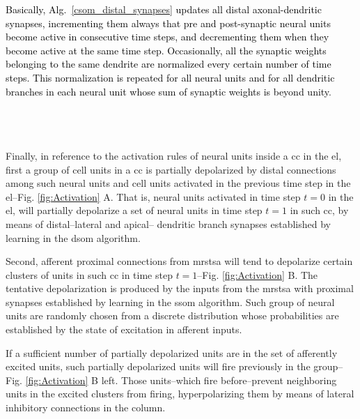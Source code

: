 \documentclass[10pt,letterpaper]{article}
\newcommand{\reviewerfour}[1]{\textcolor{black}{#1}}
\begin{document}
\reviewerfour{Basically, Alg.~\ref{csom_distal_synapses} updates all distal axonal-dendritic synapses, incrementing  them always that pre and post-synaptic neural units become active in consecutive time steps, and decrementing them when they become active at the same time step. Occasionally, all the synaptic weights belonging to the same dendrite are normalized every certain number of time steps. This normalization is repeated for all neural units and for all dendritic branches in each neural unit whose sum of synaptic weights is beyond unity}.







~\\
~\\
~\\

Finally, in reference to the activation rules of neural units inside a \gls{cc} in the \gls{el},
first a group of cell units in a \gls{cc} is partially depolarized 
by distal connections among such neural units and cell units activated in the
previous time step in the \gls{el}--Fig. \ref{fig:Activation} A.
That is, neural units activated in time step $t=0$ in the \gls{el}, will partially depolarize
a set of neural units in time step $t=1$ in such \gls{cc}, by means of distal--lateral and apical--
dendritic branch synapses established by learning in the \gls{dsom} algorithm.

Second, afferent proximal connections from \gls{mrstsa} will tend to depolarize
certain clusters of units in such \gls{cc} in time step $t=1$--Fig. \ref{fig:Activation} B.
The tentative depolarization is produced by the inputs from the \gls{mrstsa} with
proximal synapses established by learning in the \gls{ssom} algorithm. 
Such group of neural units are randomly chosen from a discrete distribution
whose probabilities are established by the state of excitation in afferent inputs.

If a sufficient number of partially depolarized units are in the set of
afferently excited units, such partially depolarized units
will fire previously in the group--Fig. \ref{fig:Activation} B left.
Those units--which fire before--prevent neighboring units in the excited clusters from firing,
hyperpolarizing them by means of lateral inhibitory connections in the column.
\end{document}
